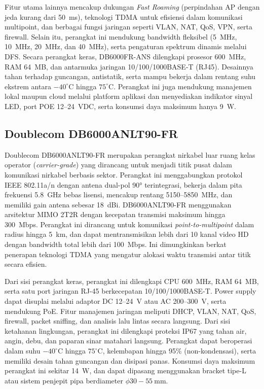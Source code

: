 Fitur utama lainnya mencakup dukungan \emph{Fast Roaming} (perpindahan AP dengan jeda kurang dari 50~ms), teknologi TDMA untuk efisiensi dalam komunikasi multipoint, dan berbagai fungsi jaringan seperti VLAN, NAT, QoS, VPN, serta firewall. Selain itu, perangkat ini mendukung bandwidth fleksibel (5~MHz, 10~MHz, 20~MHz, dan 40~MHz), serta pengaturan spektrum dinamis melalui DFS. Secara perangkat keras, DB6000FR-ANS dilengkapi prosesor 600~MHz, RAM 64~MB, dan antarmuka jaringan 10/100/1000BASE-T (RJ45). Desainnya tahan terhadap guncangan, antistatik, serta mampu bekerja dalam rentang suhu ekstrem antara \(-40^\circ\text{C}\) hingga \(75^\circ\text{C}\). Perangkat ini juga mendukung manajemen lokal maupun cloud melalui platform aplikasi dan menyediakan indikator sinyal LED, port POE 12--24~VDC, serta konsumsi daya maksimum hanya 9~W.

\subsection{Doublecom DB6000ANLT90-FR}
Doublecom DB6000ANLT90-FR merupakan perangkat nirkabel luar ruang kelas operator (\emph{carrier-grade}) yang dirancang untuk menjadi titik pusat dalam komunikasi nirkabel berbasis sektor. Perangkat ini menggabungkan protokol IEEE 802.11a/n dengan antena dual-pol 90° terintegrasi, bekerja dalam pita frekuensi 5.8~GHz bebas lisensi, mencakup rentang 5150--5850~MHz, dan memiliki gain antena sebesar 18~dBi. DB6000ANLT90-FR menggunakan arsitektur MIMO 2T2R dengan kecepatan transmisi maksimum hingga 300~Mbps. Perangkat ini dirancang untuk komunikasi \emph{point-to-multipoint} dalam radius hingga 5~km, dan dapat mentransmisikan lebih dari 10 kanal video HD dengan bandwidth total lebih dari 100~Mbps. Ini dimungkinkan berkat penerapan teknologi TDMA yang mengatur alokasi waktu transmisi antar titik secara efisien.

Dari sisi perangkat keras, perangkat ini dilengkapi CPU 600~MHz, RAM 64~MB, serta satu port jaringan RJ-45 berkecepatan 10/100/1000BASE-T. Power supply dapat disuplai melalui adaptor DC 12--24~V atau AC 200--300~V, serta mendukung PoE. Fitur manajemen jaringan meliputi DHCP, VLAN, NAT, QoS, firewall, packet sniffing, dan analisis lalu lintas secara langsung. Dari sisi ketahanan lingkungan, perangkat ini dilengkapi proteksi IP67 yang tahan air, angin, debu, dan paparan sinar matahari langsung. Perangkat dapat beroperasi dalam suhu \(-40^\circ\text{C}\) hingga \(75^\circ\text{C}\), kelembapan hingga 95\% (non-kondensasi), serta memiliki desain tahan guncangan dan disipasi panas. Konsumsi daya maksimum perangkat ini sekitar 14~W, dan dapat dipasang menggunakan bracket tipe-L atau sistem penjepit pipa berdiameter \(\phi 30{-}55~\text{mm}\).

